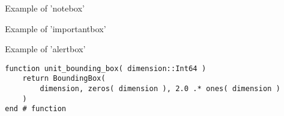 \begin{notebox}{Example of 'notebox'}
	\blindtext
\end{notebox}

\begin{importantbox}{Example of 'importantbox'}
	\blindtext
\end{importantbox}

\begin{alertbox}{Example of 'alertbox'}
	\blindtext
\end{alertbox}

\begin{lstlisting}[caption = {Example of 'lstlisting' with Julia code}, label = {code:example}, float]
function unit_bounding_box( dimension::Int64 )
	return BoundingBox(
		dimension, zeros( dimension ), 2.0 .* ones( dimension )
	)
end # function
\end{lstlisting}

